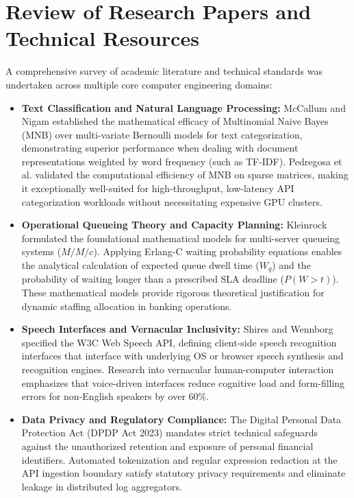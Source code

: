 \section{Review of Research Papers and Technical Resources}
A comprehensive survey of academic literature and technical standards was undertaken across multiple core computer engineering domains:
\begin{itemize}
    \item \textbf{Text Classification and Natural Language Processing:} McCallum and Nigam \cite{mccallum1998comparison} established the mathematical efficacy of Multinomial Naive Bayes (MNB) over multi-variate Bernoulli models for text categorization, demonstrating superior performance when dealing with document representations weighted by word frequency (such as TF-IDF). Pedregosa et al. \cite{pedregosa2011scikit} validated the computational efficiency of MNB on sparse matrices, making it exceptionally well-suited for high-throughput, low-latency API categorization workloads without necessitating expensive GPU clusters.
    \item \textbf{Operational Queueing Theory and Capacity Planning:} Kleinrock \cite{kleinrock1975queueing} formulated the foundational mathematical models for multi-server queueing systems ($M/M/c$). Applying Erlang-C waiting probability equations enables the analytical calculation of expected queue dwell time ($W_q$) and the probability of waiting longer than a prescribed SLA deadline ($P(W > t)$). These mathematical models provide rigorous theoretical justification for dynamic staffing allocation in banking operations.
    \item \textbf{Speech Interfaces and Vernacular Inclusivity:} Shires and Wennborg \cite{w3c_webspeech_2012} specified the W3C Web Speech API, defining client-side speech recognition interfaces that interface with underlying OS or browser speech synthesis and recognition engines. Research into vernacular human-computer interaction emphasizes that voice-driven interfaces reduce cognitive load and form-filling errors for non-English speakers by over 60\%.
    \item \textbf{Data Privacy and Regulatory Compliance:} The Digital Personal Data Protection Act (DPDP Act 2023) \cite{dpdp_act_2023} mandates strict technical safeguards against the unauthorized retention and exposure of personal financial identifiers. Automated tokenization and regular expression redaction at the API ingestion boundary satisfy statutory privacy requirements and eliminate leakage in distributed log aggregators.
\end{itemize}

